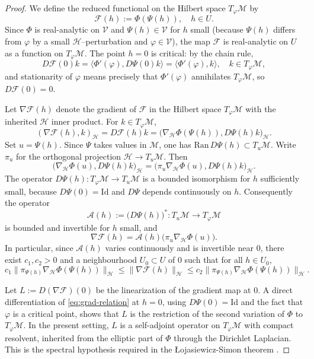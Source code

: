 \documentclass[10pt,a4paper]{amsart}
\numberwithin{equation}{section}
\begin{document}
\begin{proof}
We define the reduced functional on the Hilbert space $T_\varphi\mathcal M$ by
\[
\mathcal F(h):=\Phi(\Psi(h)),\quad h\in U.
\]
Since $\Phi$ is real-analytic on $\mathcal V$ and $\Psi(h)\in\mathcal V$ for $h$
small (because
$\Psi(h)$ differs from $\varphi$ by a small $\mathcal H$--perturbation and
$\varphi\in\mathcal V$),
the map $\mathcal F$ is real-analytic on $U$ as a function on $T_\varphi\mathcal M$.
The point $h=0$ is critical: by the chain rule,
\[
D\mathcal F(0)k
=\langle \Phi'(\varphi),D\Psi(0)k\rangle
=\langle \Phi'(\varphi),k\rangle,
\quad k\in T_\varphi\mathcal M,
\]
and stationarity of $\varphi$ means precisely that $\Phi'(\varphi)$ annihilates
$T_\varphi\mathcal M$, so $D\mathcal F(0)=0$.

Let $\nabla\mathcal F(h)$ denote the gradient of $\mathcal F$ in the Hilbert space
$T_\varphi\mathcal M$ with the inherited $\mathcal H$ inner product.
For $k\in T_\varphi\mathcal M$,
\[
(\nabla\mathcal F(h),k)_{\mathcal H}=D\mathcal F(h)k
=\bigl(\nabla_{\mathcal H}\Phi(\Psi(h)),D\Psi(h)k\bigr)_{\mathcal H}.
\]
Set $u=\Psi(h)$. Since $\Psi$ takes values in $\mathcal M$, one has
$\mathrm{Ran}\,D\Psi(h)\subset T_u\mathcal M$.
Write $\pi_u$ for the orthogonal projection $\mathcal H\to T_u\mathcal M$. Then
\[
\bigl(\nabla_{\mathcal H}\Phi(u),D\Psi(h)k\bigr)_{\mathcal H}
=\bigl(\pi_u\nabla_{\mathcal H}\Phi(u),D\Psi(h)k\bigr)_{\mathcal H}.
\]
The operator $D\Psi(h):T_\varphi\mathcal M\to T_u\mathcal M$ is a bounded isomorphism
for $h$ sufficiently small, because $D\Psi(0)=\mathrm{Id}$ and $D\Psi$ depends
continuously on $h$. Consequently the operator
\[
\mathcal A(h):=\bigl(D\Psi(h)\bigr)^{\!*}:T_u\mathcal M\to T_\varphi\mathcal M
\]
is bounded and invertible for $h$ small, and
\begin{equation}\label{eq:grad-relation}
\nabla\mathcal F(h)=\mathcal A(h)\bigl(\pi_u\nabla_{\mathcal H}\Phi(u)\bigr).
\end{equation}
In particular, since $\mathcal A(h)$ varies continuously and is invertible near $0$,
there exist $c_1,c_2>0$ and a neighbourhood $U_0\subset U$ of $0$ such that for all
$h\in U_0$,
\begin{equation}\label{eq:norm-equivalence}
c_1\|\pi_{\Psi(h)}\nabla_{\mathcal H}\Phi(\Psi(h))\|_{\mathcal H}
\le \|\nabla\mathcal F(h)\|_{\mathcal H}
\le c_2\|\pi_{\Psi(h)}\nabla_{\mathcal H}\Phi(\Psi(h))\|_{\mathcal H}.
\end{equation}

Let $L:=D(\nabla\mathcal F)(0)$ be the linearization of the gradient map at $0$. A direct
differentiation of \eqref{eq:grad-relation} at $h=0$, using $D\Psi(0)=\mathrm{Id}$ and
the fact that $\varphi$ is a critical point, shows that $L$ is the restriction of the
second variation of $\Phi$ to $T_\varphi\mathcal M$. In the present setting, $L$ is a
self-adjoint operator on $T_\varphi\mathcal M$ with compact resolvent, inherited from
the elliptic part of $\Phi$ through
the Dirichlet Laplacian. This is the spectral hypothesis required in the
\L{o}jasiewicz-Simon theorem \cite{Simon}.


\end{proof}
\end{document}
